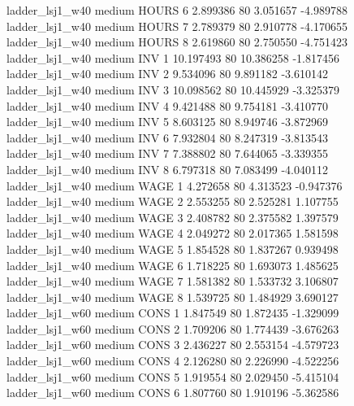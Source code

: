     ladder_lsj1_w40     medium    HOURS                 6  2.899386 80       3.051657          -4.989788
    ladder_lsj1_w40     medium    HOURS                 7  2.789379 80       2.910778          -4.170655
    ladder_lsj1_w40     medium    HOURS                 8  2.619860 80       2.750550          -4.751423
    ladder_lsj1_w40     medium      INV                 1 10.197493 80      10.386258          -1.817456
    ladder_lsj1_w40     medium      INV                 2  9.534096 80       9.891182          -3.610142
    ladder_lsj1_w40     medium      INV                 3 10.098562 80      10.445929          -3.325379
    ladder_lsj1_w40     medium      INV                 4  9.421488 80       9.754181          -3.410770
    ladder_lsj1_w40     medium      INV                 5  8.603125 80       8.949746          -3.872969
    ladder_lsj1_w40     medium      INV                 6  7.932804 80       8.247319          -3.813543
    ladder_lsj1_w40     medium      INV                 7  7.388802 80       7.644065          -3.339355
    ladder_lsj1_w40     medium      INV                 8  6.797318 80       7.083499          -4.040112
    ladder_lsj1_w40     medium     WAGE                 1  4.272658 80       4.313523          -0.947376
    ladder_lsj1_w40     medium     WAGE                 2  2.553255 80       2.525281           1.107755
    ladder_lsj1_w40     medium     WAGE                 3  2.408782 80       2.375582           1.397579
    ladder_lsj1_w40     medium     WAGE                 4  2.049272 80       2.017365           1.581598
    ladder_lsj1_w40     medium     WAGE                 5  1.854528 80       1.837267           0.939498
    ladder_lsj1_w40     medium     WAGE                 6  1.718225 80       1.693073           1.485625
    ladder_lsj1_w40     medium     WAGE                 7  1.581382 80       1.533732           3.106807
    ladder_lsj1_w40     medium     WAGE                 8  1.539725 80       1.484929           3.690127
    ladder_lsj1_w60     medium     CONS                 1  1.847549 80       1.872435          -1.329099
    ladder_lsj1_w60     medium     CONS                 2  1.709206 80       1.774439          -3.676263
    ladder_lsj1_w60     medium     CONS                 3  2.436227 80       2.553154          -4.579723
    ladder_lsj1_w60     medium     CONS                 4  2.126280 80       2.226990          -4.522256
    ladder_lsj1_w60     medium     CONS                 5  1.919554 80       2.029450          -5.415104
    ladder_lsj1_w60     medium     CONS                 6  1.807760 80       1.910196          -5.362586
